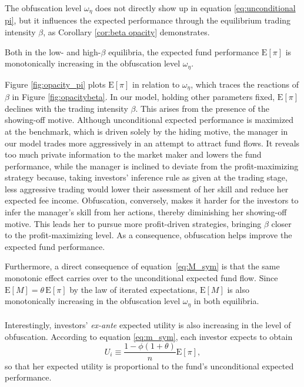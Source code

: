 The obfuscation level $\omega_{\eta}$ does not directly show up in equation \eqref{eq:unconditional pi}, but it influences the expected performance through the equilibrium trading intensity $\beta$, as Corollary \ref{cor:beta opacity} demonstrates.
\begin{corollary}\label{cor:opacity_performance}
     Both in the low- and high-$\beta$ equilibria, the expected fund performance $\mathrm{E}[\pi]$ is monotonically increasing in the obfuscation level $\omega_{\eta}$.
 \end{corollary}
 
 Figure \ref{fig:opacity_pi} plots $\mathrm{E}[\pi]$ in relation to  $\omega_{\eta}$, which traces the reactions of $\beta$ in Figure \ref{fig:opacitybeta}. In our model, holding other parameters fixed, $\mathrm{E}[\pi]$ declines with the trading intensity $\beta$. This arises from the presence of the showing-off motive. Although unconditional expected performance is maximized at the \citet{kyle1985continuous} benchmark, which is driven solely by the hiding motive, the manager in our model trades more aggressively in an attempt to attract fund flows. It reveals too much private information to the market maker and lowers the fund performance, while the manager is inclined to deviate from the profit-maximizing strategy because, taking investors' inference rule as given at the trading stage, less aggressive trading would lower their assessment of her skill and reduce her expected fee income. Obfuscation, conversely, makes it harder for the investors to infer the manager's skill from her actions, thereby diminishing her showing-off motive. This leads her to pursue more profit-driven strategies, bringing $\beta$ closer to the profit-maximizing level. As a consequence, obfuscation helps improve the expected fund performance.

 Furthermore, a direct consequence of equation~\eqref{eq:M_sym} is that the same monotonic effect carries over to the unconditional expected fund flow. Since $\mathrm{E}[M] = \theta\,\mathrm{E}[\pi]$ by the law of iterated expectations, $\mathrm{E}[M]$ is also monotonically increasing in the obfuscation level $\omega_{\eta}$ in both equilibria.

\paragraph{}
Interestingly, investors' \textit{ex-ante} expected utility is also increasing in the level of obfuscation. According to equation \eqref{eq:m_sym}, each investor expects to obtain
 \begin{equation}
     U_{i} \equiv \frac{1-\phi(1+\theta)}{n}\mathrm{E}[\pi],\label{eq:investor utility}
 \end{equation}
 so that her expected utility is proportional to the fund's unconditional expected performance. 
 
